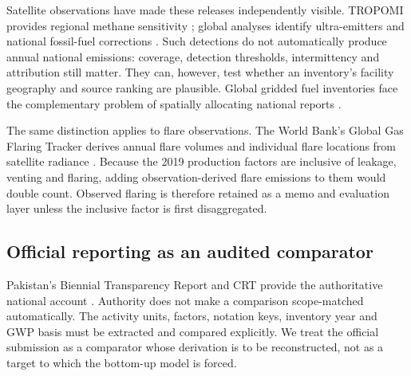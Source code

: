 Satellite observations have made these releases independently visible. TROPOMI provides regional
methane sensitivity \citep{veefkind2012}; global analyses identify ultra-emitters
\citep{lauvaux2022} and national fossil-fuel corrections \citep{chen2023national}. Such
detections do not automatically produce annual national emissions: coverage, detection
thresholds, intermittency and attribution still matter. They can, however, test whether an
inventory's facility geography and source ranking are plausible. Global gridded fuel inventories
face the complementary problem of spatially allocating national reports
\citep{scarpelli2020,scarpelli2022}.

The same distinction applies to flare observations. The World Bank's Global Gas Flaring Tracker
derives annual flare volumes and individual flare locations from satellite radiance
\citep{worldbankflaring2026}. Because the 2019 production factors are inclusive of leakage,
venting and flaring, adding observation-derived flare emissions to them would double count.
Observed flaring is therefore retained as a memo and evaluation layer unless the inclusive
factor is first disaggregated.

\subsection{Official reporting as an audited comparator}

Pakistan's Biennial Transparency Report and CRT provide the authoritative national account
\citep{pakbtr2024,pakcrt2026}. Authority does not make a comparison scope-matched automatically.
The activity units, factors, notation keys, inventory year and GWP basis must be extracted and
compared explicitly. We treat the official submission as a comparator whose derivation is to be
reconstructed, not as a target to which the bottom-up model is forced.
